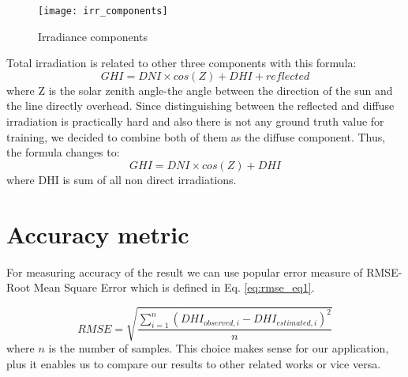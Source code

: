 \begin{figure}[h]
\caption{Irradiance components}
\label{fig:irr_comps}
\texttt{[image: irr\_components]}
\centering
\end{figure} 

Total irradiation is related to other three components with this formula:
\[ GHI = DNI \times cos (Z) + DHI + reflected \]
where Z is the solar zenith angle-the angle between the direction of the sun and the line directly overhead.
Since distinguishing between the reflected and diffuse irradiation is practically hard and also there is not any ground truth value for training, we decided to combine both of them as the diffuse component. Thus, the formula changes to:
\begin{equation}
\label{eq:irr_components}
GHI = DNI \times cos (Z) + DHI
\end{equation}
where DHI is sum of all non direct irradiations.

\section{Accuracy metric}
For measuring accuracy of the result we can use popular error measure of RMSE-Root Mean Square Error which is defined in Eq. \ref{eq:rmse_eq1}.

\begin{equation}
\label{eq:rmse_eq1}
RMSE = \sqrt{\frac{\sum_{i=1}^{n}{(DHI_{observed, i} - DHI_{estimated ,i})^2}}{n}}
\end{equation}
where $n$ is the number of samples. This choice makes sense for our application, plus it enables us to compare our results to other related works or vice versa.



